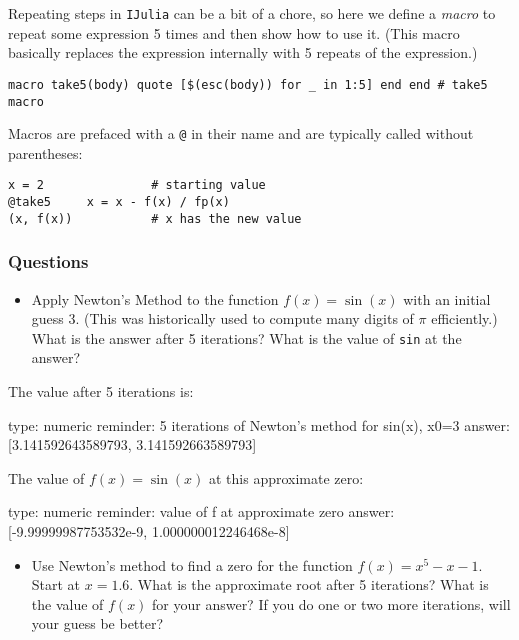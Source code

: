 \documentclass[12pt]{article}
\begin{document}
Repeating steps in \texttt{IJulia} can be a bit of a chore, so here we
define a \emph{macro} to repeat some expression 5 times and then show
how to use it. (This macro basically replaces the expression internally
with 5 repeats of the expression.)



\begin{verbatim}
macro take5(body) quote [$(esc(body)) for _ in 1:5] end end # take5 macro
\end{verbatim}
Macros are prefaced with a \texttt{@} in their name and are typically
called without parentheses:



\begin{verbatim}
x = 2               # starting value
@take5     x = x - f(x) / fp(x)
(x, f(x))           # x has the new value
\end{verbatim}
\subsubsection{Questions}

\begin{itemize}
\itemsep1pt\parskip0pt
\item
  Apply Newton's Method to the function $f(x) = \sin(x)$ with an initial
  guess $3$. (This was historically used to compute many digits of $\pi$
  efficiently.) What is the answer after 5 iterations? What is the value
  of \texttt{sin} at the answer?
\end{itemize}

The value after 5 iterations is:

\begin{answer}
    type: numeric
    reminder: 5 iterations of Newton's method for sin(x), x0=3
    answer: [3.141592643589793, 3.141592663589793]

\end{answer}

The value of $f(x)=\sin(x)$ at this approximate zero:

\begin{answer}
    type: numeric
    reminder: value of f at approximate zero
    answer: [-9.99999987753532e-9, 1.000000012246468e-8]

\end{answer}

\begin{itemize}
\itemsep1pt\parskip0pt
\item
  Use Newton's method to find a zero for the function $f(x)=x^5-x-1$.
  Start at $x=1.6$. What is the approximate root after 5 iterations?
  What is the value of $f(x)$ for your answer? If you do one or two more
  iterations, will your guess be better?
\end{itemize}
\end{document}
